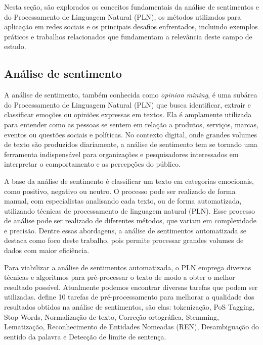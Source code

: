 \documentclass[
	12pt,				%
	oneside,			%
	a4paper,			%
	english,			%
	french,				%
	spanish,			%
	brazil				%
	]{abntex2}
\begin{document}
Nesta seção, são explorados os conceitos fundamentais da análise de
sentimentos e do Processamento de Linguagem Natural (PLN), os métodos
utilizados para aplicação em redes sociais e os principais desafios
enfrentados, incluindo exemplos práticos e trabalhos relacionados que
fundamentam a relevância deste campo de estudo.

\hypertarget{anuxe1lise-de-sentimento}{%
\subsection{Análise de sentimento}\label{anuxe1lise-de-sentimento}}

A análise de sentimento, também conhecida como \emph{opinion mining}, é
uma subárea do Processamento de Linguagem Natural (PLN) que busca
identificar, extrair e classificar emoções ou opiniões expressas em
textos. Ela é amplamente utilizada para entender como as pessoas se
sentem em relação a produtos, serviços, marcas, eventos ou questões
sociais e políticas. No contexto digital, onde grandes volumes de texto
são produzidos diariamente, a análise de sentimento tem se tornado uma
ferramenta indispensável para organizações e pesquisadores interessados
em interpretar o comportamento e as percepções do público.

A base da análise de sentimento é classificar um texto em categorias
emocionais, como positivo, negativo ou neutro. O processo pode ser
realizado de forma manual, com especialistas analisando cada texto, ou
de forma automatizada, utilizando técnicas de processamento de linguagem
natural (PLN). Esse processo de análise pode ser realizado de diferentes
métodos, que variam em complexidade e precisão. Dentre essas abordagens,
a análise de sentimentos automatizada se destaca como foco deste
trabalho, pois permite processar grandes volumes de dados com maior
eficiência.

Para viabilizar a análise de sentimentos automatizada, o PLN emprega
diversas técnicas e algoritmos para pré-processar o texto de modo a
obter o melhor resultado possível. Atualmente podemos encontrar diversas
tarefas que podem ser utilizadas. 
define 10 tarefas de pré-processamento para melhorar a qualidade dos
resultados obtidos na análise de sentimentos, são elas: tokenização, PoS
Tagging, Stop Words, Normalização de texto, Correção ortográfica,
Stemming, Lematização, Reconhecimento de Entidades Nomeadas (REN),
Desambiguação do sentido da palavra e Detecção de limite de sentença.
\end{document}
